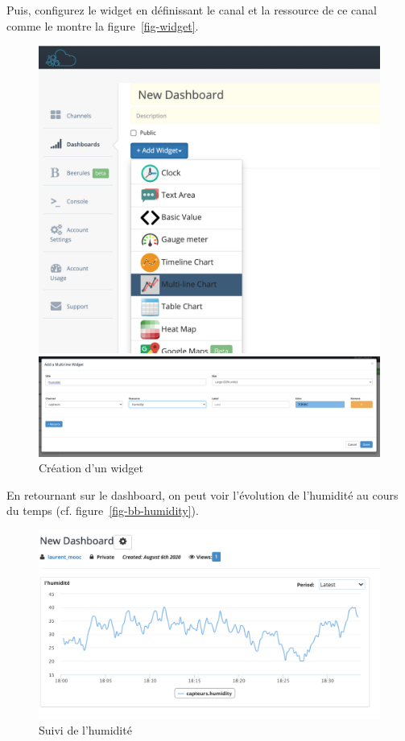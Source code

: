  

Puis, configurez le widget en définissant le canal et la ressource de ce canal comme le montre la figure~\vref{fig-widget}.

\begin{figure}[tbp]
\centerline{\includegraphics[width=0.5\columnwidth]{Pictures/bb_new_widget.png}}
       \vspace{1em}
\centerline{\includegraphics[width=0.5\columnwidth]{Pictures/bb_conf_widget.png}}
\caption{Création d'un widget}
\label{fig-widget}
\end{figure}


En retournant sur le dashboard, on peut voir l’évolution de l’humidité au cours du temps (cf. figure~\vref{fig-bb-humidity}). 

\begin{figure}[tbp]
\centerline{\includegraphics[width=1\columnwidth]{Pictures/bb_humidity.png}}
\caption{Suivi de l'humidité}
\label{fig-bb-humidity}
\end{figure}

